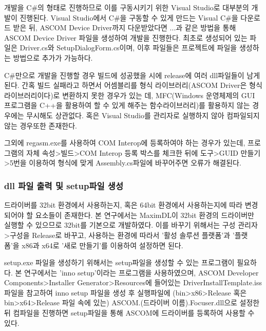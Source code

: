 개발을 C\#의 형태로 진행하므로 이를 구동시키기 위한 Visual Studio로 대부분의 개발이 진행된다. Visual Studio에서 C\#을 구동할 수 있게 만드는 Visual C\#을 다운로드 받은 뒤, ASCOM Device Driver까지 다운받았다면 ...과 같은 방법을 통해 ASCOM Device Driver 파일을 생성하여 개발을 진행한다. 최초로 생성되어 있는 파일은 Driver.cs와 SetupDialogForm.cs이며, 이후 파일들은 프로젝트에 파일을 생성하는 방법으로 추가가 가능하다.

C\#만으로 개발을 진행할 경우 빌드에 성공했을 시에 release에 여러 dll파일들이 남게 된다. 간혹 빌드 실패라고 하면서 어셈블리를 형식 라이브러리(ASCOM Driver은 형식 라이브러리이다)로 변환하지 못한 경우가 있는 데, MFC(Windows 운영체제의 GUI 프로그램을  C++을 활용하여 할 수 있게 해주는 함수라이브러리)를 활용하지 않는 경우에는 무시해도 상관없다. 혹은 Visual Studio를 관리자로 실행하지 않아 컴파일되지 않는 경우또한 존재한다.

그외에 regasm.exe를 사용하여 COM Interop에 등록하여야 하는 경우가 있는데, 프로그램의 자체 속성>빌드>COM Interop 등록 박스를 체크한 뒤에 도구>GUID 만들기>5번을 이용하여 형식에 맞게 Assembly.cs파일에 바꾸어주면 오류가 해결된다.

\subsubsection{dll 파일 출력 및 setup파일 생성}
드라이버를 32bit 환경에서 사용하는지, 혹은 64bit 환경에서 사용하는지에 따라 변경되어야 할 요소들이 존재한다. 본 연구에서는 MaximDL이 32bit 환경의 드라이버만 실행할 수 있으므로 32bit를 기본으로 개발하였다. 이를 바꾸기 위해서는 구성 관리자>구성을 Release로 바꾸고, 사용하는 환경에 따라서 '활성 솔루션 플랫폼'과 '플랫폼'을 x86과 x64로 '새로 만들기'를 이용하여 설정하면 된다.

setup.exe 파일을 생성하기 위해서는 setup파일을 생성할 수 있는 프로그램이 필요하다. 본 연구에서는 'inno setup'이라는 프로그램을 사용하였으며, ASCOM Developer Components>Installer Generator>Resources에 들어있는 DriverInstallTemplate.iss파일을 참고하여 inno setup 파일을 생성 후 실행파일에 (bin>x86>Release 혹은 bin>x64>Release 파일 속에 있는) ASCOM.(드라이버 이름).Focuser.dll으로 설정한 뒤 컴파일을 진행하면 setup파일을 통해 ASCOM에 드라이버를 등록하여 사용할 수 있다.